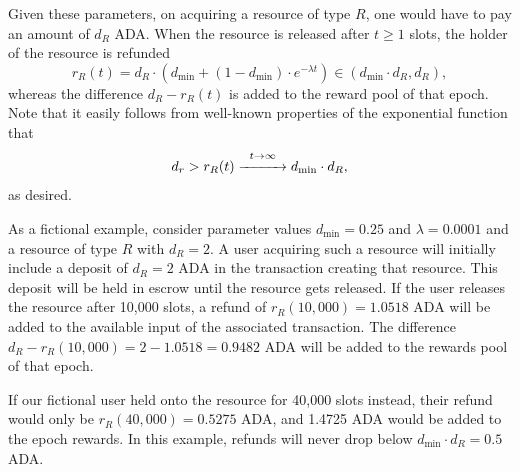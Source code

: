 \documentclass[11pt,a4paper]{article}
\begin{document}
Given these parameters, on acquiring a resource of type $R$, one would have to
pay an amount of $d_R$ ADA\@. When the resource is released after $t\geq 1$ slots,
the holder of the resource is refunded
\[
    r_R(t)=d_R\cdot\left(d_{\min}+(1-d_{\min})\cdot e^{-\lambda t}\right)\in(d_{\min}\cdot d_R,d_R),
\]
whereas the difference $d_R-r_R(t)$ is added to the reward pool of that epoch.
Note that it easily follows from well-known properties of the exponential
function that
\[
    d_r>r_R(t)\stackrel{t\rightarrow\infty}{\xrightarrow{\hspace{10mm}}}d_{\min}\cdot d_R,
\]
as desired.

As a fictional example, consider parameter values $d_{\min}=0.25$ and $\lambda=0.0001$
and a resource of type $R$ with $d_R=2$. A user acquiring such a resource
will initially include a deposit of $d_R=2$ ADA in the transaction creating that
resource. This deposit will be held in escrow until the resource gets released.
If the user releases the resource after 10,000 slots, a refund of
$r_R(10,000)=1.0518$ ADA will be added to the available input of the associated
transaction. The difference $d_R-r_R(10,000)=2-1.0518=0.9482$ ADA will be added
to the rewards pool of that epoch.

If our fictional user held onto the resource for 40,000 slots instead,
their refund would only be $r_R(40,000)=0.5275$ ADA, and 1.4725 ADA
would be added to the epoch rewards. In this example, refunds will
never drop below $d_{\min}\cdot d_R=0.5$ ADA.




\end{document}
